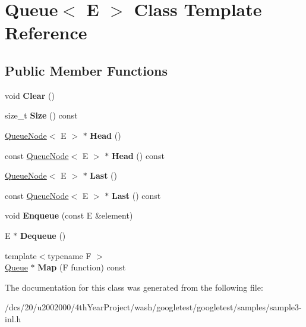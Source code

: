 \hypertarget{classQueue}{}\section{Queue$<$ E $>$ Class Template Reference}
\label{classQueue}
\subsection*{Public Member Functions}
\begin{DoxyCompactItemize}
\item 
\mbox{\label{classQueue_acfdd5f9f7e936ca30dcf877370ef9510}} 
void {\bfseries Clear} ()
\item 
\mbox{\label{classQueue_abc4d78b5f66041011c5590bf703847b0}} 
size\+\_\+t {\bfseries Size} () const
\item 
\mbox{\label{classQueue_a71aa0154ef75bb87a53b6af1829fcd5e}} 
\mbox{\hyperlink{classQueueNode}{Queue\+Node}}$<$ E $>$ $\ast$ {\bfseries Head} ()
\item 
\mbox{\label{classQueue_a6c906075e0ad2d1f0634990aa106395e}} 
const \mbox{\hyperlink{classQueueNode}{Queue\+Node}}$<$ E $>$ $\ast$ {\bfseries Head} () const
\item 
\mbox{\label{classQueue_a430aca3d3b9f5fd588b215028d134b74}} 
\mbox{\hyperlink{classQueueNode}{Queue\+Node}}$<$ E $>$ $\ast$ {\bfseries Last} ()
\item 
\mbox{\label{classQueue_a7c8c2c64700dfe1df8bf266572cf101a}} 
const \mbox{\hyperlink{classQueueNode}{Queue\+Node}}$<$ E $>$ $\ast$ {\bfseries Last} () const
\item 
\mbox{\label{classQueue_abaa2e7175457307bca74f5562cbdaaa9}} 
void {\bfseries Enqueue} (const E \&element)
\item 
\mbox{\label{classQueue_a434d465001c3078e999f7a89a8af84c0}} 
E $\ast$ {\bfseries Dequeue} ()
\item 
\mbox{\label{classQueue_a904a696292fc593adc6fd21fb229d760}} 
{\footnotesize template$<$typename F $>$ }\\\mbox{\hyperlink{classQueue}{Queue}} $\ast$ {\bfseries Map} (F function) const
\end{DoxyCompactItemize}


The documentation for this class was generated from the following file\+:\begin{DoxyCompactItemize}
\item 
/dcs/20/u2002000/4th\+Year\+Project/wash/googletest/googletest/samples/sample3-\/inl.\+h\end{DoxyCompactItemize}
